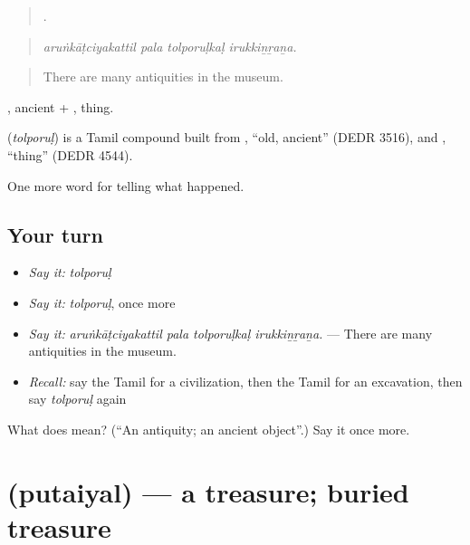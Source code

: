 \begin{quote}
   .
\end{quote}

\begin{quote}
\emph{aruṅkāṭciyakattil pala tolporuḷkaḷ irukkiṉṟaṉa.}
\end{quote}

\begin{quote}
There are many antiquities in the museum.
\end{quote}

, ancient + , thing.

\begin{cousinweb}
\textbf{} (\emph{tolporuḷ}) is a Tamil compound built from , \textquotedblleft{}old, ancient\textquotedblright{} (DEDR 3516), and , \textquotedblleft{}thing\textquotedblright{} (DEDR 4544).
\end{cousinweb}

\begin{grammarlens}[title={What you've built}]
One more word for telling what happened.
\end{grammarlens}

\subsection*{Your turn}
\begin{itemize}
\raggedright
  \item \emph{Say it:} \emph{tolporuḷ}
  \item \emph{Say it:} \emph{tolporuḷ}, once more
  \item \emph{Say it:} \emph{aruṅkāṭciyakattil pala tolporuḷkaḷ irukkiṉṟaṉa.} — There are many antiquities in the museum.
  \item \emph{Recall:} say the Tamil for a civilization, then the Tamil for an excavation, then say \emph{tolporuḷ} again
\end{itemize}

\begin{tcolorbox}[breakable,colback=teal!4,colframe=teal!35!black,title={Before you move on}]
What does  mean? (\textquotedblleft{}An antiquity; an ancient object\textquotedblright{}.) Say it once more.
\end{tcolorbox}
\section[\texorpdfstring{\ta{புதையல்} (putaiyal)}{புதையல் (putaiyal)}]{ (putaiyal) — a treasure; buried treasure}

